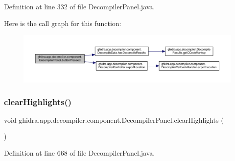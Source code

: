 Definition at line 332 of file Decompiler\+Panel.\+java.

Here is the call graph for this function\+:
\nopagebreak
\begin{figure}[H]
\begin{center}
\leavevmode
\includegraphics[width=350pt]{classghidra_1_1app_1_1decompiler_1_1component_1_1_decompiler_panel_a6e2548f82106d402f3e618830ae78d1d_cgraph}
\end{center}
\end{figure}
\mbox{\label{classghidra_1_1app_1_1decompiler_1_1component_1_1_decompiler_panel_a65e87140728b77057dd7defafccf293d}} 
\subsubsection{\texorpdfstring{clearHighlights()}{clearHighlights()}}
{\footnotesize\ttfamily void ghidra.\+app.\+decompiler.\+component.\+Decompiler\+Panel.\+clear\+Highlights (\begin{DoxyParamCaption}{ }\end{DoxyParamCaption})\hspace{0.3cm}{\ttfamily [inline]}}



Definition at line 668 of file Decompiler\+Panel.\+java.

